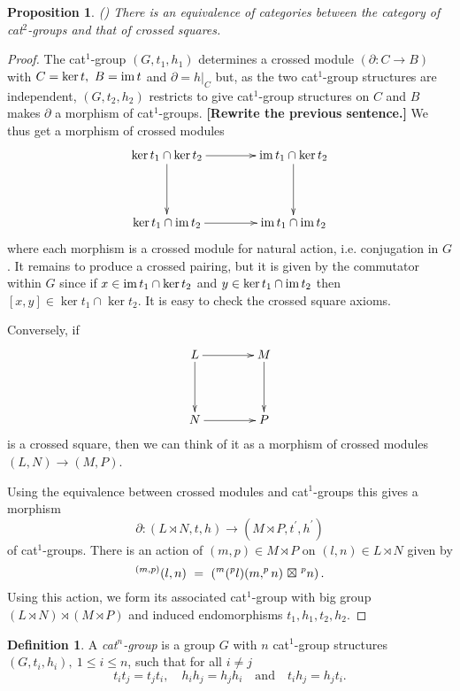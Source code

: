 \documentclass[a4paper,11pt]{article}
\theoremstyle{plain}
\newtheorem{proposition}[theorem]{Proposition}
\theoremstyle{definition}
\newtheorem{definition}[theorem]{Definition}
\begin{document}
\begin{proposition}
\label{loday} \emph{(\cite{Loday})} 
There is an equivalence of categories between the category of cat$^{2}$-groups 
and that of crossed squares.
\end{proposition}
\begin{proof}
The cat$^{1}$-group $(G,t_1,h_1)$ determines a crossed module 
$(\partial : C \rightarrow B)$ with $C = \ker t,~ B = \mathrm{im}\, t$ 
and $\partial =h|_{C}$ 
but, as the two cat$^{1}$-group structures are independent, 
$(G,t_2,h_2)$ restricts to give cat$^{1}$-group structures on $C$ 
and $B$ makes $\partial $ a morphism of cat$^{1}$-groups. 
{\bf[Rewrite the previous sentence.]} 
We thus get a morphism of crossed modules
\[
\xymatrix@R=40pt@C=40pt
{ \ker t_1 \cap \ker t_2 \ar[d] \ar[r] 
  	  & \im t_1 \cap \ker t_2 \ar[d] \\ 
  \ker t_1 \cap \im t_2 \ar[r] 
	  & \im t_1 \cap \im t_2 } 
\]
\noindent where each morphism is a crossed module for natural action, 
i.e. conjugation in $G$. 
It remains to produce a crossed pairing, 
but it is given by the commutator within $G$ 
since if $x \in \mathrm{im}\, t_1 \cap \ker t_2$ 
and $y\in \ker t_1 \cap \mathrm{im}\, t_2$ then $[x,y] \in \ker t_1 \cap \ker t_2$. 
It is easy to check the crossed square axioms.
	
Conversely, if
\[
\xymatrix@R=40pt@C=40pt
{ L \ar[d] \ar[r] 
	& M \ar[d] \\ 
	N \ar[r] 
	& P }  
\]
\noindent is a crossed square, 
then we can think of it as a morphism of crossed modules $(L,N) \rightarrow (M,P)$.
	
Using the equivalence between crossed modules and cat$^{1}$-groups this
gives a morphism
\[
\partial : (L \rtimes N,t,h) \longrightarrow (M \rtimes P, t^{\prime}, h^{\prime})
\]
of cat$^{1}$-groups. 
There is an action of $(m,p) \in M \rtimes P$ on $(l,n) \in L \rtimes N$ 
given by
\[
^{(m,p)}(l,n) ~=~ (^{m}(^{p}l) (m,^{p}n) {\ \boxtimes\ } ^{p}n)\,.
\] 
Using this action, we form its associated cat$^{1}$-group with big group 
$(L \rtimes N) \rtimes (M \rtimes P)$ 
and induced endomorphisms $t_1,h_1,t_2,h_2$.
\end{proof}

\begin{definition}
A \emph{cat$^{n}$-group} is a group $G$ with $n$ cat$^{1}$-group structures  
$(G,t_{i},h_{i}),~ 1\leq i\leq n$, such that for all $i \ne j$ 
\[
t_{i}t_{j} = t_{j}t_{i}, \quad 
h_{i}h_{j} = h_{j}h_{i} \quad \mbox{and} \quad 
t_{i}h_{j} = h_{j}t_{i}. 
\]
\end{definition}
\end{document}
